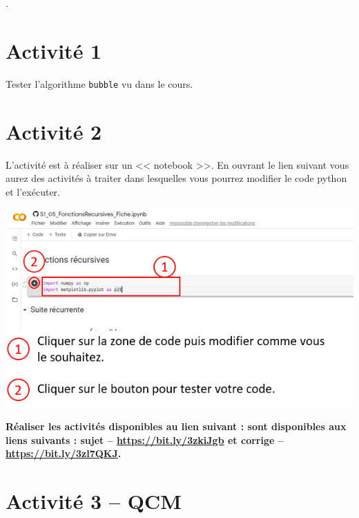 \documentclass[t,10pt]{article}
\begin{document}
\enteteinfo

\setlength{\columnseprule}{0.4pt}.

\section*{Activité 1}

Tester l'algorithme \texttt{bubble} vu dans le cours. 

\section*{Activité 2}

L'activité est à réaliser sur un  << notebook >>.  En ouvrant le lien suivant vous aurez des activités à traiter dans lesquelles vous pourrez modifier le code python et l'exécuter.

\begin{center}
\includegraphics[width=.6\linewidth]{collab}
\end{center}

\textbf{Réaliser les activités disponibles au lien suivant :  sont disponibles aux liens suivants : sujet -- \url{https://bit.ly/3zkiJgb} et corrige -- \url{https://bit.ly/3zl7QKJ}.}



\section*{Activité 3 -- QCM}

\begin{multicols}{2}

\end{multicols}
\end{document}
